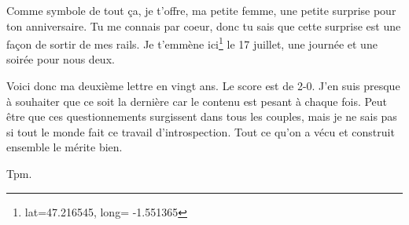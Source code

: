 \documentclass[a4paper,10pt]{letter}
\begin{document}
\begin{letter}{}
Comme symbole de tout ça, je t'offre, ma petite femme, une petite surprise pour ton anniversaire. 
Tu me connais par coeur, donc tu sais que cette surprise est une façon de sortir de mes rails. 
Je t'emmène ici\footnote{lat=47.216545, long= -1.551365} 
le 17 juillet, une journée et une soirée pour nous deux.

Voici donc ma deuxième lettre en vingt ans. Le score est de 2-0. 
J'en suis presque à souhaiter que ce soit la dernière car le contenu est pesant à chaque fois.
Peut être que ces questionnements surgissent dans tous les couples, mais je ne sais pas si tout le
monde fait ce travail d'introspection. Tout ce qu'on a vécu et construit ensemble le mérite bien.


	  \closing{Tpm.}
\end{letter}
\end{document}

